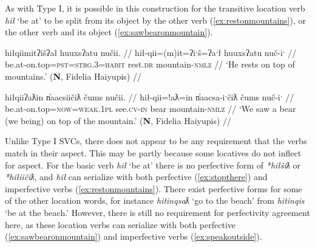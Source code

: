 As with Type I, it is possible in this construction for the transitive location verb \textit{hił} `be at' to be split from its object by the other verb (\ref{ex:restonmountains}), or the other verb and its object (\ref{ex:sawbearonmountain}).

\ex \label{ex:restonmountains}
\begingl
\glpreamble hiłqiimitʔišʔał huuxsʔatu nučii. //
\gla hił-qii=(m)it=ʔiˑš=ʔaˑł huuxsʔatu nuč-iˑ //
\glb be.at-on.top=\textsc{pst}=\textsc{strg.3}=\textsc{habit} rest.\textsc{dr} mountain-\textsc{nmlz} //
\glft `He rests on top of mountains.' (\textbf{N}, Fidelia Haiyupis) //
\endgl
\xe

\ex \label{ex:sawbearonmountain}
\begingl
\glpreamble hiłqiiʔaƛin n̓aacsiičiƛ čums nučii. //
\gla hił-qii=!aƛ=in n̓aacsa-iˑčiƛ čums nuč-iˑ //
\glb be.at-on.top=\textsc{now}=\textsc{weak.1pl} see.\textsc{cv}-\textsc{in} bear mountain-\textsc{nmlz} //
\glft `We saw a bear (we being) on top of the mountain.' (\textbf{N}, Fidelia Haiyupis) //
\endgl
\xe

\begin{comment}
\ex~ \label{ex:hiddeninthewall}
\begingl
\glpreamble huptsaapckʷaƛ hinałc̓ił ʔiiḥmisukʔi p̓atquk. //
\gla hupt-saˑp=ckʷiˑ=!aƛ hina-ałc̓ił ʔiiḥmis=uk=ʔiˑ p̓atquk //
\glb hide-\textsc{mo.caus}=remains.of=\textsc{now} \textsc{empty}-in.wall important=\textsc{poss}=\textsc{art} belongings //
\glft `They hid their belongings in the walls.' (\textbf{B}, Bob Mundy) //
\endgl
\xe
\end{comment}

\begin{comment}
This ``interruption" can occur the other way around, when the location word is intransitive.

\ex \label{ex:gasolinebydoor}
\begingl
\glpreamble ḥuqšiƛ ʔucačiƛ ḥaa yaqʔiitq hiiłsʔat̓uus gasoline.\footnotemark //
\gla ḥuq-šiƛ ʔu-ca-čiƛ ḥaa yaq=ʔiˑtq hił-L.sʔat̓uus gasoline //
\glb tip.over-\textsc{mo} \textsc{x}-go-\textsc{mo} who.what=\textsc{defn.3} be.at-by.the.door gasoline //
\glft `It knocked the gasoline over toward the door..' (\textbf{C}, \textit{tupaat} Julia Lucas) //
\endgl
\xe

\footnotetext{In this dependent construction, `gasoline' is the participant of the predicative relativizer \textit{yaq} `who'. The bracketing is [ḥuqšiƛ ʔucačiƛ]\textsubscript{pred} [ḥaa [yaqʔiitq hiiłsʔat̓uus gasoline] ]\textsubscript{part}}
\end{comment}

Unlike Type I SVCs, there does not appear to be any requirement that the verbs match in their aspect. This may be partly because some locatives do not inflect for aspect. For the basic verb \textit{hił} `be at' there is no perfective form of \textit{*hiłšiƛ} or \textit{*hiłiičiƛ}, and \textit{hił} can serialize with both perfective (\ref{ex:stopthere}) and imperfective verbs (\ref{ex:restonmountains}). There exist perfective forms for some of the other location words, for instance \textit{hitinqsaƛ} `go to the beach' from \textit{hitinqis} `be at the beach.' However, there is still no requirement for perfectivity agreement here, as these location verbs can serialize with both perfective (\ref{ex:sawbearonmountain}) and imperfective verbs (\ref{ex:speakoutside}).

